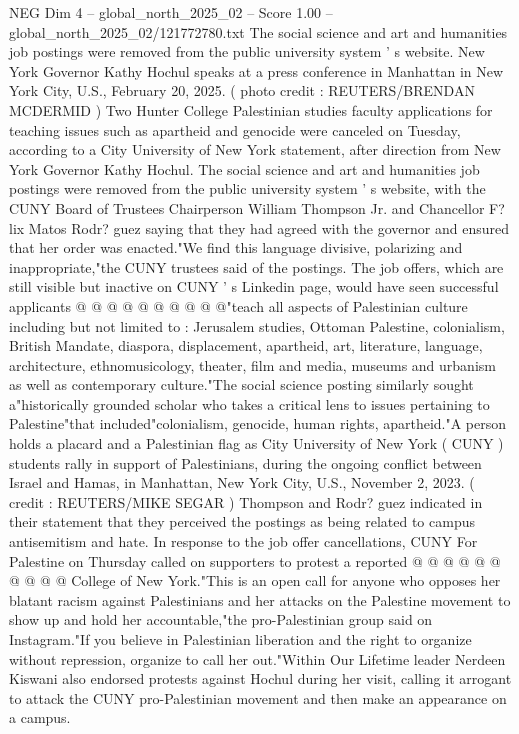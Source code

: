 \begin{textsample}{NEG Dim 4 – global\_north\_2025\_02 – Score 1.00 – global\_north\_2025\_02/121772780.txt}  \label{ex:f4_neg_408}
The social science and art and humanities job postings were removed from the public university system ' s website.
New York Governor Kathy Hochul speaks at a press conference in Manhattan in New York City, U.S., February 20, 2025. ( photo credit : REUTERS/BRENDAN MCDERMID ) Two Hunter College Palestinian studies faculty applications for teaching issues such as apartheid and genocide were canceled on Tuesday, according to a City University of New York statement, after direction from New York Governor Kathy Hochul.
The social science and art and humanities job postings were removed from the public university system ' s website, with the CUNY Board of Trustees Chairperson William Thompson Jr. and Chancellor F? lix Matos Rodr? guez saying that they had agreed with the governor and ensured that her order was enacted."We find this language divisive, polarizing and inappropriate,"the CUNY trustees said of the postings.
The job offers, which are still visible but inactive on CUNY ' s Linkedin page, would have seen successful applicants @ @ @ @ @ @ @ @ @ @"teach all aspects of Palestinian culture including but not limited to : Jerusalem studies, Ottoman Palestine, colonialism, British Mandate, diaspora, displacement, apartheid, art, literature, language, architecture, ethnomusicology, theater, film and media, museums and urbanism as well as contemporary culture."The social science posting similarly sought a"historically grounded scholar who takes a critical lens to issues pertaining to Palestine"that included"colonialism, genocide, human rights, apartheid."A person holds a placard and a Palestinian flag as City University of New York ( CUNY ) students rally in support of Palestinians, during the ongoing conflict between Israel and Hamas, in Manhattan, New York City, U.S., November 2, 2023. ( credit : REUTERS/MIKE SEGAR ) Thompson and Rodr? guez indicated in their statement that they perceived the postings as being related to campus antisemitism and hate.
In response to the job offer cancellations, CUNY For Palestine on Thursday called on supporters to protest a reported @ @ @ @ @ @ @ @ @ @ College of New York."This is an open call for anyone who opposes her blatant racism against Palestinians and her attacks on the Palestine movement to show up and hold her accountable,"the pro-Palestinian group said on Instagram."If you believe in Palestinian liberation and the right to organize without repression, organize to call her out."Within Our Lifetime leader Nerdeen Kiswani also endorsed protests against Hochul during her visit, calling it arrogant to attack the CUNY pro-Palestinian movement and then make an appearance on a campus.

\end{textsample}

